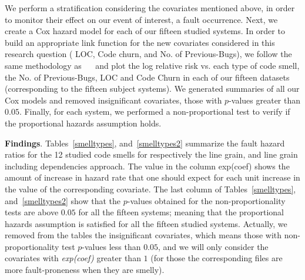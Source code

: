 %
We perform a stratification considering the covariates mentioned above, in order to monitor their effect on our event of interest, \ie{} a fault occurrence. Next, we create a Cox hazard model for each of our {\color{blue}fifteen} studied systems. %
In order to build an appropriate link function for the new covariates considered in this research question (\ie{} LOC, Code churn, and No. of Previous-Bugs), we follow the same methodology as ~\cite{koru2008theory}~\cite{selim2010studying} and plot the log relative risk vs. each type of code smell, the No. of Previous-Bugs, LOC and Code Churn in each of our {\color{blue}fifteen} datasets (corresponding to the {\color{blue}fifteen} subject systems). We generated summaries of all our Cox models and removed insignificant covariates, \ie{} those with $p$-values greater than $0.05$. Finally, for each system, we performed a non-proportional test to verify if the proportional hazards assumption holds. %

\textbf{Findings}. {\color{blue}Tables~\ref{smelltypes}, and~\ref{smelltypes2} summarize the fault hazard ratios for the 12 studied code smells for respectively the line grain, and line grain including dependencies approach}. The value in the column exp(coef) shows the amount of increase in hazard rate that one should expect for each unit increase in the value of the corresponding covariate. %
The last column of {\color{blue}Tables~\ref{smelltypes}, and~\ref{smelltypes2}} show that the $p$-values obtained for the non-proportionality tests are above $0.05$ for all the {\color{blue}fifteen} systems; meaning that the proportional hazards assumption is satisfied for all the {\color{blue}fifteen} studied systems. {\color{blue}Actually, we removed from the tables the insignificant covariates, which means those with non-proportionality test $p$-values less than $0.05$, and we will only consider the covariates with \textsl{exp(coef)} greater than $1$ (for those the corresponding files are more fault-proneness when they are smelly).}

